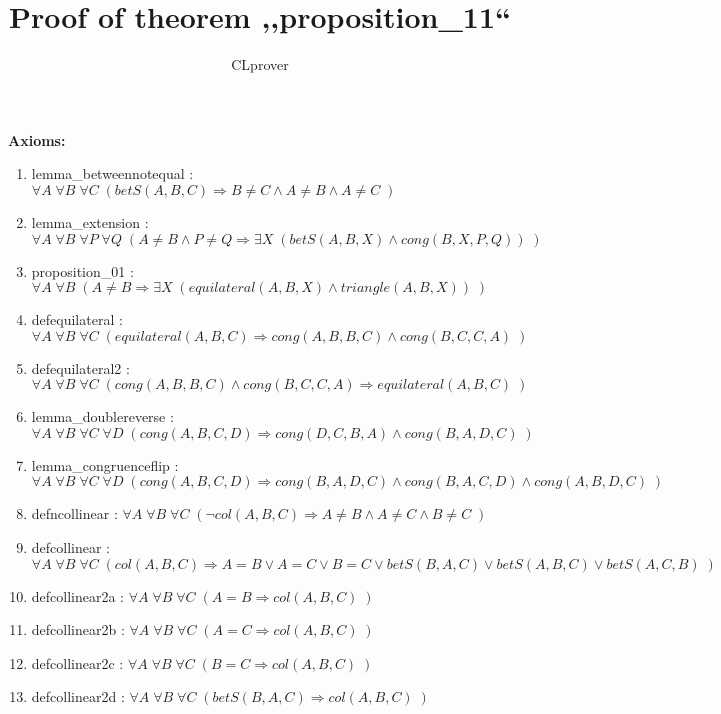 \documentclass{article}
\begin{document}
\title{Proof of theorem ,,proposition\_11``}
\author{CLprover}
\maketitle

\noindent 
{\bfseries Axioms:} 
\begin{enumerate}
\item lemma\_betweennotequal : $\forall A \; \forall B \; \forall C \; ( betS(A, B, C) \Rightarrow B \neq C\wedge A \neq B\wedge A \neq C\;)$
\item lemma\_extension : $\forall A \; \forall B \; \forall P \; \forall Q \; ( A \neq B\wedge P \neq Q \Rightarrow \exists X \; (betS(A, B, X)\wedge cong(B, X, P, Q))\;)$
\item proposition\_01 : $\forall A \; \forall B \; ( A \neq B \Rightarrow \exists X \; (equilateral(A, B, X)\wedge triangle(A, B, X))\;)$
\item defequilateral : $\forall A \; \forall B \; \forall C \; ( equilateral(A, B, C) \Rightarrow cong(A, B, B, C)\wedge cong(B, C, C, A)\;)$
\item defequilateral2 : $\forall A \; \forall B \; \forall C \; ( cong(A, B, B, C)\wedge cong(B, C, C, A) \Rightarrow equilateral(A, B, C)\;)$
\item lemma\_doublereverse : $\forall A \; \forall B \; \forall C \; \forall D \; ( cong(A, B, C, D) \Rightarrow cong(D, C, B, A)\wedge cong(B, A, D, C)\;)$
\item lemma\_congruenceflip : $\forall A \; \forall B \; \forall C \; \forall D \; ( cong(A, B, C, D) \Rightarrow cong(B, A, D, C)\wedge cong(B, A, C, D)\wedge cong(A, B, D, C)\;)$
\item defncollinear : $\forall A \; \forall B \; \forall C \; ( \neg col(A, B, C) \Rightarrow A \neq B\wedge A \neq C\wedge B \neq C\;)$
\item defcollinear : $\forall A \; \forall B \; \forall C \; ( col(A, B, C) \Rightarrow A = B\vee A = C\vee B = C\vee betS(B, A, C)\vee betS(A, B, C)\vee betS(A, C, B)\;)$
\item defcollinear2a : $\forall A \; \forall B \; \forall C \; ( A = B \Rightarrow col(A, B, C)\;)$
\item defcollinear2b : $\forall A \; \forall B \; \forall C \; ( A = C \Rightarrow col(A, B, C)\;)$
\item defcollinear2c : $\forall A \; \forall B \; \forall C \; ( B = C \Rightarrow col(A, B, C)\;)$
\item defcollinear2d : $\forall A \; \forall B \; \forall C \; ( betS(B, A, C) \Rightarrow col(A, B, C)\;)$

\end{enumerate}
\end{document}
